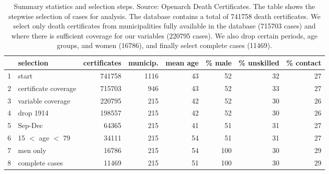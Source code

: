 \begin{table}[ht]
\centering
\begin{tabular}{rlrrrrrr}
  \hline
 & selection & certificates & municip. & mean age & \% male & \% unskilled & \% contact \\ 
  \hline
1 & start & 741758 & 1116 & 43 & 52 & 32 & 27 \\ 
  2 & certificate coverage & 715703 & 946 & 43 & 52 & 33 & 27 \\ 
  3 & variable coverage & 220795 & 215 & 42 & 52 & 30 & 26 \\ 
  4 & drop 1914 & 198557 & 215 & 42 & 52 & 30 & 26 \\ 
  5 & Sep-Dec & 64365 & 215 & 41 & 51 & 31 & 27 \\ 
  6 & 15 $<$ age $<$ 79 & 34111 & 215 & 54 & 51 & 31 & 27 \\ 
  7 & men only & 16786 & 215 & 54 & 100 & 30 & 29 \\ 
  8 & complete cases & 11469 & 215 & 51 & 100 & 30 & 29 \\ 
   \hline
\end{tabular}
\caption{Summary statistics and selection steps. Source: Openarch Death Certificates. The table shows the stepwise selection of cases for analysis. The database contains a total of 741758 death certificates. We select only death certificates from municipalities fully available in the database (715703 cases) and where there is sufficient coverage for our variables (220795 cases). We also drop certain periods, age groups, and women (16786), and finally select complete cases (11469).} 
\label{sumselect}
\end{table}
